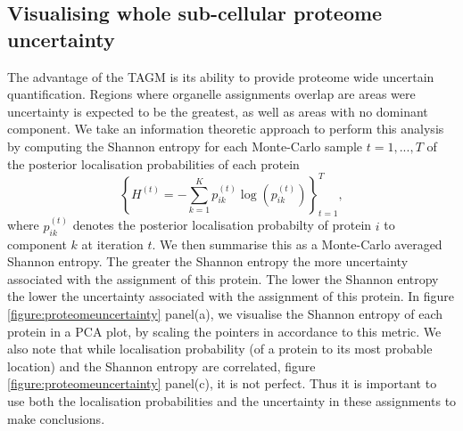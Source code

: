 \documentclass[12pt,english]{article}\usepackage[]{graphicx}\usepackage[]{color}
\begin{document}
\clearpage

\subsection{Visualising whole sub-cellular proteome uncertainty}

The advantage of the TAGM is its ability to provide proteome wide
uncertain quantification. Regions where organelle assignments overlap
are areas were uncertainty is expected to be the greatest, as well
as areas with no dominant component. We take an information
theoretic approach to perform this analysis by computing
the Shannon entropy \citep{shannon:1948} for each Monte-Carlo sample $t = 1,...,T$ of
the posterior localisation probabilities of each protein
\begin{equation}
\left\{H^{(t)} = - \sum_{k=1}^Kp^{(t)}_{ik} \log\left(p^{(t)}_{ik}\right)\right\}^{T}_{t=1},
\end{equation}
where $p^{(t)}_{ik}$ denotes the posterior localisation probabilty of protein $i$ to component $k$
at iteration $t$. We then summarise this as a Monte-Carlo averaged Shannon entropy.
The greater the Shannon entropy the more uncertainty
associated with the assignment of this protein. The lower the Shannon entropy
the lower the uncertainty associated with the assignment of this protein.
In figure \ref{figure:proteomeuncertainty} panel(a), we visualise the Shannon entropy
of each protein in a PCA plot, by scaling the pointers in accordance to this
metric. We also note
that while localisation probability (of a protein to its most probable location)
and the Shannon entropy are correlated, figure \ref{figure:proteomeuncertainty} panel(c), it is not perfect. Thus
it is important to use both the localisation probabilities and the uncertainty in
these assignments to make conclusions.
\end{document}
